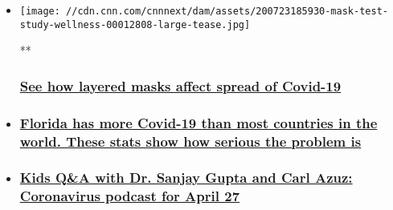 \begin{itemize}
\item
  \href{/videos/app-health-section/2020/07/23/mask-test-study-wellness.cnn}{}

  \texttt{[image: //cdn.cnn.com/cnnnext/dam/assets/200723185930-mask-test-study-wellness-00012808-large-tease.jpg]}

  **

  \hypertarget{see-how-layered-masks-affect-spread-of-covid-19}{%
  \subsubsection{\texorpdfstring{\href{/videos/app-health-section/2020/07/23/mask-test-study-wellness.cnn}{See
  how layered masks affect spread of
  Covid-19}}{See how layered masks affect spread of Covid-19}}\label{see-how-layered-masks-affect-spread-of-covid-19}}
\item
  \hypertarget{florida-has-more-covid-19-than-most-countries-in-the-world-these-stats-show-how-serious-the-problem-is}{%
  \subsubsection{\texorpdfstring{\href{/2020/07/13/health/florida-coronavirus-cases-comparisons/index.html}{Florida
  has more Covid-19 than most countries in the world. These stats show
  how serious the problem
  is}}{Florida has more Covid-19 than most countries in the world. These stats show how serious the problem is}}\label{florida-has-more-covid-19-than-most-countries-in-the-world-these-stats-show-how-serious-the-problem-is}}
\item
  \hypertarget{kids-qa-with-dr-sanjay-gupta-and-carl-azuz-coronavirus-podcast-for-april-27}{%
  \subsubsection{\texorpdfstring{\href{/2020/04/27/health/sanjay-gupta-coronavirus-podcast-april-27-wellness/index.html}{Kids
  Q\&A with Dr. Sanjay Gupta and Carl Azuz: Coronavirus podcast for
  April
  27}}{Kids Q\&A with Dr. Sanjay Gupta and Carl Azuz: Coronavirus podcast for April 27}}\label{kids-qa-with-dr-sanjay-gupta-and-carl-azuz-coronavirus-podcast-for-april-27}}
\end{itemize}

